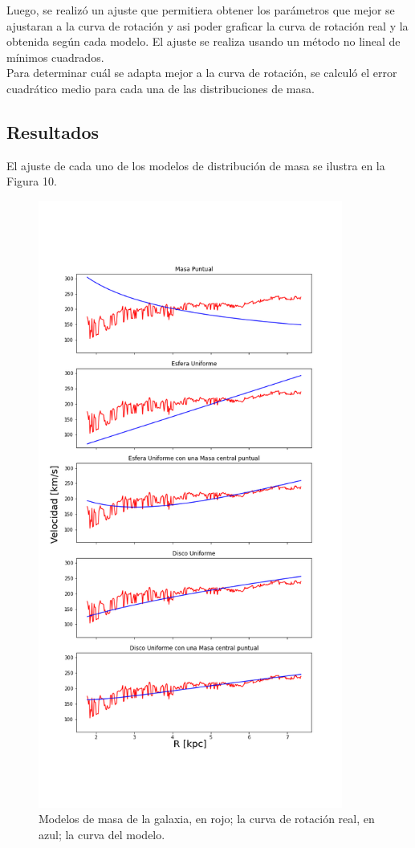 \documentclass[letterpaper,oneside]{article}
\begin{document}
Luego, se realizó un ajuste que permitiera obtener los parámetros que mejor se ajustaran a la curva de rotación y asi poder graficar la curva de rotación  real y la obtenida según cada modelo. El ajuste se realiza usando un método no lineal de mínimos cuadrados.\\

Para determinar cuál se adapta mejor a la curva de rotación, se calculó el error cuadrático medio para cada una de las distribuciones de masa.

\subsection{Resultados}
El ajuste de cada uno de los modelos de distribución de masa se ilustra en la Figura 10.

\begin{figure}
  \centering
  \includegraphics[height=20cm]{../graficos/modelos.png}
  \caption{Modelos de masa de la galaxia, en rojo; la curva de rotación real, en azul; la curva del modelo.}
\end{figure}
\end{document}
